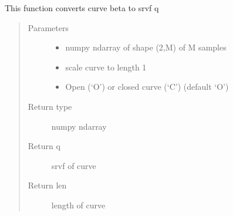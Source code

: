 \documentclass[letterpaper,10pt,english]{sphinxmanual}
\begin{document}

\begin{fulllineitems}
\label{\detokenize{curve_functions:curve_functions.curve_to_q}}
This function converts curve beta to srvf q
\begin{quote}\begin{description}
\item[{Parameters}] \leavevmode\begin{itemize}
\item {} 
 \textendash{} numpy ndarray of shape (2,M) of M samples

\item {} 
 \textendash{} scale curve to length 1

\item {} 
 \textendash{} Open (‘O’) or closed curve (‘C’) (default ‘O’)

\end{itemize}

\item[{Return type}] \leavevmode
numpy ndarray

\item[{Return q}] \leavevmode
srvf of curve

\item[{Return len}] \leavevmode
length of curve

\end{description}\end{quote}

\end{fulllineitems}

\end{document}
